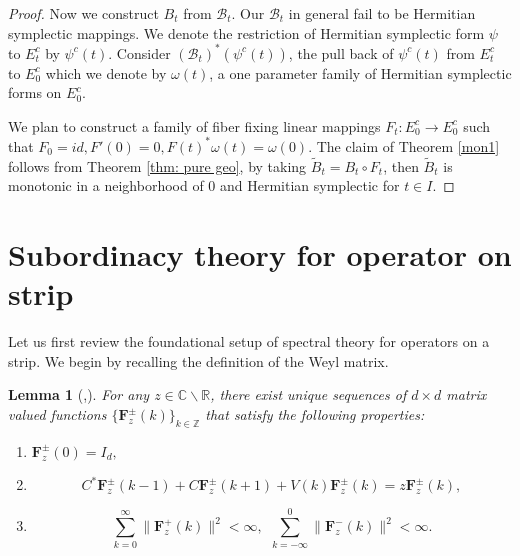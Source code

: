 \documentclass[11pt]{amsart}
\newtheorem{lemma}[theorem]{Lemma}
\theoremstyle{remark}
\theoremstyle{definition}
\newcommand{\B}{{\mathbf B}}
\def \B{\mathcal{B}}
\begin{document}
\begin{proof}
Now we construct $B_t$ from $\B_t$. Our $\B_t$ in general fail to be Hermitian symplectic mappings. We denote the restriction of Hermitian symplectic form $\psi$ to $E^c_t$ by $\psi^c(t)$. Consider $(\B_t)^\ast(\psi^c(t))$, the pull back of $\psi^c(t)$ from $E^c_t$ to $E^c_0$ which we denote by $\omega(t)$, a one parameter family of Hermitian symplectic forms on $E^c_0$.

 
We plan to construct a family of fiber fixing linear mappings $F_t: E^c_0\to E^c_0$ such that $F_0=id, F'(0)=0, F(t)^{\ast}\omega(t)=\omega(0)$.
The claim of Theorem \ref{mon1} 
follows from Theorem \ref{thm: pure geo}, by taking $\tilde B_t=B_t\circ F_t$, then $\tilde B_t$ is monotonic in a neighborhood of $0$ and Hermitian symplectic for $t\in I$.



    \end{proof}


    
   






\section{Subordinacy theory for operator on strip}\label{subor}

Let us first review the foundational setup of spectral theory for operators on a strip. We begin by recalling the definition of the Weyl matrix.

\begin{lemma}[\cite{KS},\cite{Puig}]\label{M}
	For any $z\in\mathbb{C}\backslash\mathbb{R}$, there exist unique sequences of $d\times d$ matrix
	valued functions $\{\mathbf{F}^{\pm}_z(k)\}_{k\in\mathbb{Z}}$ that
	satisfy the following properties:
	\begin{enumerate}
		\item $\mathbf{F}^\pm_z(0)=I_d,$
		\item  $$
		C^*\mathbf{F}^{\pm}_z(k-1)+C\mathbf{F}^\pm_z(k+1)+V(k)\mathbf{F}^\pm_z(k)=z \mathbf{F}^\pm_z(k),
		$$
		\item
		$$
		\sum\limits_{k=0}^\infty\|\mathbf{F}^+_z(k)\|^2<\infty, \ \ \sum\limits_{k=-\infty}^{0}\|\mathbf{F}^-_z(k)\|^2<\infty.
		$$
	\end{enumerate}
\end{lemma}
\end{document}
